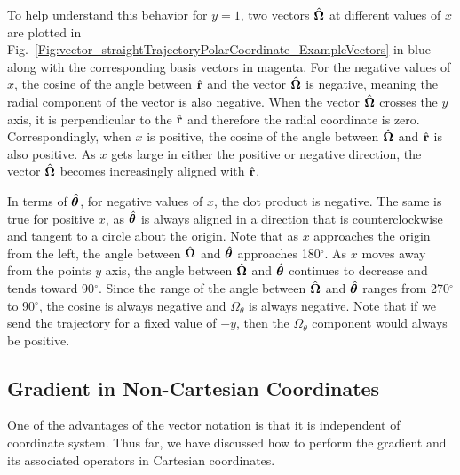 To help understand this behavior for $y = 1$, two vectors $\hat{\mathbf{\Omega}}$ at different values of $x$ are plotted in Fig.~\ref{Fig:vector_straightTrajectoryPolarCoordinate_ExampleVectors} in blue along with the corresponding basis vectors in magenta. For the negative values of $x$, the cosine of the angle between $\hat{\mathbf{r}}$ and the vector $\hat{\mathbf{\Omega}}$ is negative, meaning the radial component of the vector is also negative. When the vector $\hat{\mathbf{\Omega}}$ crosses the $y$ axis, it is perpendicular to the $\hat{\mathbf{r}}$ and therefore the radial coordinate is zero. Correspondingly, when $x$ is positive, the cosine of the angle between $\hat{\mathbf{\Omega}}$ and $\hat{\mathbf{r}}$ is also positive. As $x$ gets large in either the positive or negative direction, the vector $\hat{\mathbf{\Omega}}$ becomes increasingly aligned with $\hat{\mathbf{r}}$.

In terms of $\hat{\boldsymbol\theta}$, for negative values of $x$, the dot product is negative. The same is true for positive $x$, as $\hat{\boldsymbol\theta}$ is always aligned in a direction that is counterclockwise and tangent to a circle about the origin. Note that as $x$ approaches the origin from the left, the angle between $\hat{\mathbf{\Omega}}$ and $\hat{\boldsymbol\theta}$ approaches 180$^\circ$. As $x$ moves away from the points $y$ axis, the angle between $\hat{\mathbf{\Omega}}$ and $\hat{\boldsymbol\theta}$ continues to decrease and tends toward 90$^\circ$. Since the range of the angle between $\hat{\mathbf{\Omega}}$ and $\hat{\boldsymbol\theta}$ ranges from 270$^\circ$ to 90$^\circ$, the cosine is always negative and $\Omega_\theta$ is always negative. Note that if we send the trajectory for a fixed value of $-y$, then the $\Omega_\theta$ component would always be positive.


\subsection{Gradient in Non-Cartesian Coordinates}

One of the advantages of the vector notation is that it is independent of coordinate system. Thus far, we have discussed how to perform the gradient and its associated operators in Cartesian coordinates. 

